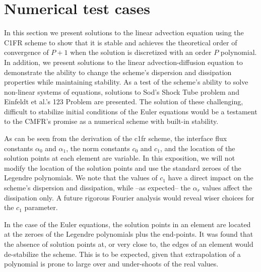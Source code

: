 \section{Numerical test cases}
\label{sec:num_cases}
In this section we present solutions to the linear advection equation using the C1FR scheme to show that it is stable and achieves the theoretical order of convergence of $P+1$ when the solution is discretized with an order $P$ polynomial. In addition, we present solutions to the linear advection-diffusion equation to demonstrate the ability to change the scheme's dispersion and dissipation properties while maintaining stability. As a test of the scheme's ability to solve non-linear systems of equations, solutions to Sod's Shock Tube problem \cite{roe1981approximate} and Einfeldt et al.'s 123 Problem \cite{einfeldt1991godunov} are presented. The solution of these challenging, difficult to stabilize initial conditions of the Euler equations would be a testament to the CMFR's promise as a numerical scheme with built-in stability.

As can be seen from the derivation of the \gls{c1fr} scheme, the interface flux constants $\alpha_0$ and $\alpha_1$, the norm constants $c_0$ and $c_1$, and the location of the solution points at each element are variable. In this exposition, we will not modify the location of the solution points and use the standard zeroes of the Legendre polynomials. We note that the values of $c_1$ have a direct impact on the scheme's dispersion and dissipation, while --as expected-- the $\alpha_r$ values affect the dissipation only. A future rigorous Fourier analysis would reveal wiser choices for the $c_1$ parameter.

In the case of the Euler equations, the solution points in an element are located at the zeroes of the Legendre polynomials plus the end-points. It was found that the absence of solution points at, or very close to, the edges of an element would de-stabilize the scheme. This is to be expected, given that extrapolation of a polynomial is prone to large over and under-shoots of the real values.





